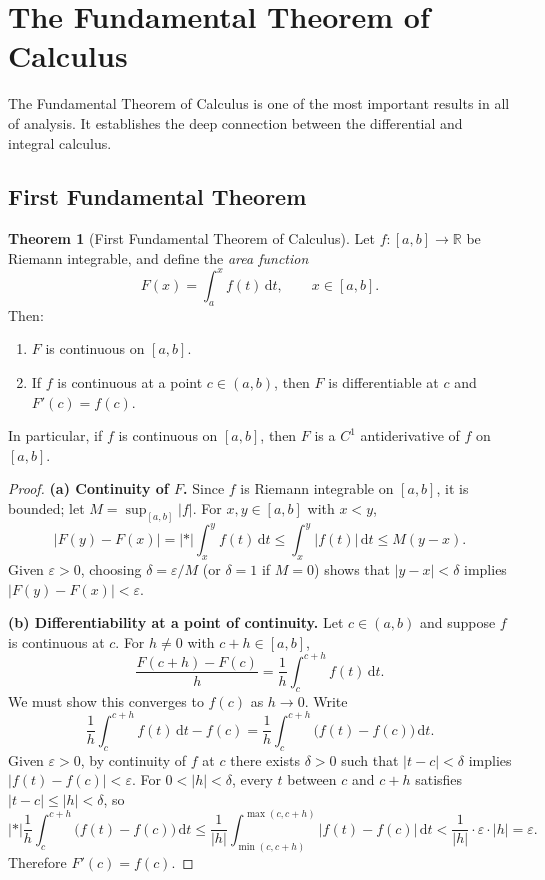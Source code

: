 \documentclass[12pt,a4paper]{book}
\theoremstyle{definition}
\newtheorem{theorem}{Theorem}[chapter]
\newcommand{\R}{\mathbb{R}}
\newcommand{\eps}{\varepsilon}
\newcommand{\abs}[1]{\left\lvert #1 \right\rvert}
\newcommand{\dd}{\,\mathrm{d}}
\begin{document}
\section{The Fundamental Theorem of Calculus}\label{sec:FTC}

The Fundamental Theorem of Calculus is one of the most important results
in all of analysis.  It establishes the deep connection between the
differential and integral calculus.

\subsection{First Fundamental Theorem}\label{subsec:FTC1}

\begin{theorem}[First Fundamental Theorem of Calculus]\label{thm:FTC1}
  Let $f\colon[a,b]\to\R$ be Riemann integrable, and define the
  \emph{area function}
  \[
    F(x) = \int_a^x f(t)\dd t, \qquad x\in[a,b].
  \]
  Then:
  \begin{enumerate}[label=(\alph*)]
    \item $F$ is continuous on $[a,b]$.
    \item If $f$ is continuous at a point $c\in(a,b)$, then $F$ is
      differentiable at $c$ and $F'(c)=f(c)$.
  \end{enumerate}
  In particular, if $f$ is continuous on $[a,b]$, then $F$ is a
  $C^1$ antiderivative of $f$ on $[a,b]$.
\end{theorem}

\begin{proof}
  \textbf{(a) Continuity of $F$.}\;
  Since $f$ is Riemann integrable on $[a,b]$, it is bounded; let
  $M=\sup_{[a,b]}\abs{f}$.  For $x,y\in[a,b]$ with $x<y$,
  \[
    \abs{F(y)-F(x)} = \abs*{\int_x^y f(t)\dd t}
    \le \int_x^y \abs{f(t)}\dd t \le M(y-x).
  \]
  Given $\eps>0$, choosing $\delta=\eps/M$ (or $\delta=1$ if $M=0$)
  shows that $\abs{y-x}<\delta$ implies $\abs{F(y)-F(x)}<\eps$.

  \textbf{(b) Differentiability at a point of continuity.}\;
  Let $c\in(a,b)$ and suppose $f$ is continuous at $c$.  For $h\ne0$
  with $c+h\in[a,b]$,
  \[
    \frac{F(c+h)-F(c)}{h}
    = \frac{1}{h}\int_c^{c+h} f(t)\dd t.
  \]
  We must show this converges to $f(c)$ as $h\to0$.  Write
  \[
    \frac{1}{h}\int_c^{c+h} f(t)\dd t - f(c)
    = \frac{1}{h}\int_c^{c+h}\bigl(f(t)-f(c)\bigr)\dd t.
  \]
  Given $\eps>0$, by continuity of $f$ at $c$ there exists $\delta>0$
  such that $\abs{t-c}<\delta$ implies $\abs{f(t)-f(c)}<\eps$.  For
  $0<\abs{h}<\delta$, every $t$ between $c$ and $c+h$ satisfies
  $\abs{t-c}\le\abs{h}<\delta$, so
  \[
    \abs*{\frac{1}{h}\int_c^{c+h}\bigl(f(t)-f(c)\bigr)\dd t}
    \le \frac{1}{\abs{h}}\int_{\min(c,c+h)}^{\max(c,c+h)}
       \abs{f(t)-f(c)}\dd t
    < \frac{1}{\abs{h}}\cdot\eps\cdot\abs{h} = \eps.
  \]
  Therefore $F'(c)=f(c)$.
\end{proof}
\end{document}
